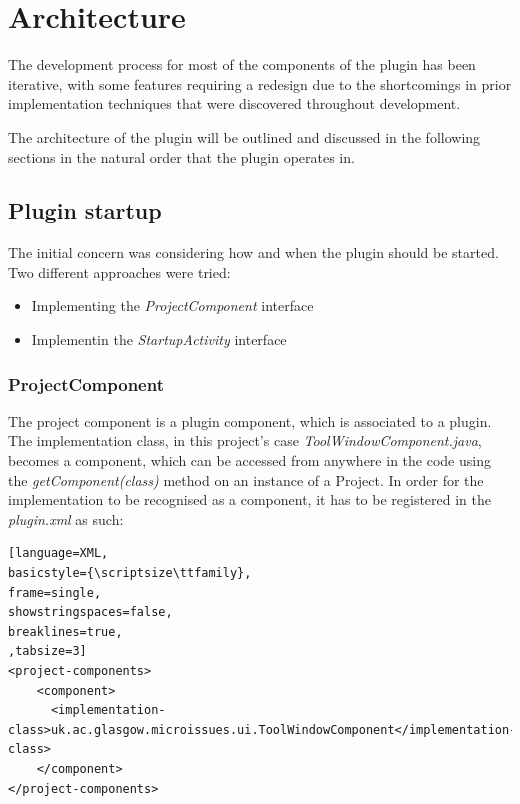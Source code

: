\documentclass{4thYearProject}
\begin{document}

\chapter{Architecture}

The development process for most of the components of the plugin has been iterative, with some features requiring a redesign due to the shortcomings in prior implementation techniques that were discovered throughout development. 

The architecture of the plugin will be outlined and discussed in the following sections in the natural order that the plugin operates in. 

\section{Plugin startup}

The initial concern was considering how and when the plugin should be started. Two different approaches were tried:
\begin{itemize}
\item Implementing the \textit{ProjectComponent} interface  
\item Implementin the \textit{StartupActivity} interface 
\end{itemize}

\subsection{ProjectComponent}

The project component is a plugin component, which is associated to a plugin. The implementation class, in this project's case \textit{ToolWindowComponent.java}, becomes a component, which can be accessed from anywhere in the code using the \textit{getComponent(class)} method on an instance of a Project. In order for the implementation to be recognised as a component, it has to be registered in the \textit{plugin.xml} as such:\\

\begin{lstlisting}[language=XML, 
basicstyle={\scriptsize\ttfamily}, 
frame=single,
showstringspaces=false,
breaklines=true,
,tabsize=3]
<project-components>
    <component>
      <implementation-class>uk.ac.glasgow.microissues.ui.ToolWindowComponent</implementation-class>
    </component>
</project-components>
\end{lstlisting}
\end{document}
